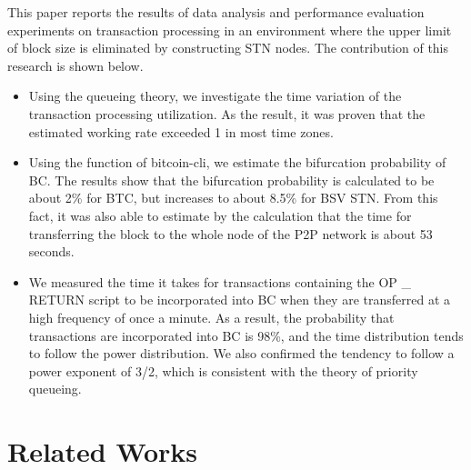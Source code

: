 \documentclass[graybox]{svmult}
\begin{document}
This paper reports the results of data analysis and performance evaluation experiments on transaction processing in an environment where the upper limit of block size is eliminated by constructing STN nodes.
The contribution of this research is shown below.
%
\begin{itemize}
  \item %
	Using the queueing theory, we investigate the time variation of the transaction processing utilization.
	As the result, it was proven that the estimated working rate exceeded 1 in most time zones.
  \item %
	Using the function of bitcoin-cli, we estimate the bifurcation probability of BC.
	The results show that the bifurcation probability is calculated to be about 2\% for BTC, but increases to about 8.5\% for BSV STN.
	From this fact, it was also able to estimate by the calculation that the time for transferring the block to the whole node of the P2P network is about 53 seconds.
  \item %
	We measured the time it takes for transactions containing the OP \_ RETURN script to be incorporated into BC when they are transferred at a high frequency of once a minute.
	As a result, the probability that transactions are incorporated into BC is 98\%, and the time distribution tends to follow the power distribution.
	We also confirmed the tendency to follow a power exponent of 3/2, which is consistent with the theory of priority queueing.
\end{itemize}
%




\section{Related Works}
\label{sec:rworks}
\end{document}
